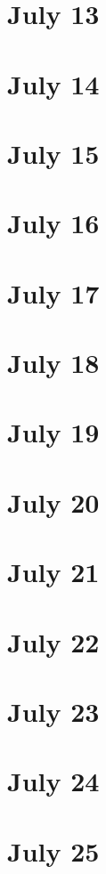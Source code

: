 \section{July 13}

\section{July 14}

\section{July 15}

\section{July 16}

\section{July 17}

\section{July 18}

\section{July 19}

\section{July 20}

\section{July 21}

\section{July 22}

\section{July 23}

\section{July 24}

\section{July 25}

